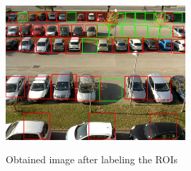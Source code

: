 \documentclass[12pt]{article}
\begin{document}
\begin{figure}
\caption{Obtained image after labeling the ROIs}
\includegraphics[width=0.6\textwidth]{2015-11-12_0947}
\label{fig:resultimg}
\end{figure}



\end{document}
